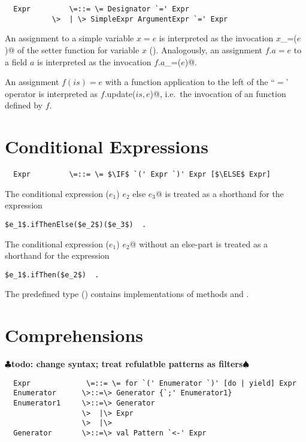 \documentclass[11pt]{report}
\renewcommand{\todo}[1]{{$\clubsuit$\bf todo: #1$\spadesuit$}}
\begin{document}
\syntax\begin{verbatim}
  Expr	       \=::= \= Designator `=' Expr
	       \>  | \> SimpleExpr ArgumentExpr `=' Expr
\end{verbatim}

An assignment to a simple variable $x = e$ is interpreted as the invocation
\verb@$x$_=($e$)@ of the setter function for variable
$x$ ().
Analogously, an assignment $f.a = e$ to a field $a$ is interpreted
as the invocation \verb@$f.a$_=($e$)@.

An assignment $f(is) = e$ with a function application to the
left of the ``$=$' operator is interpreted as \verb@$f$.update($is, e$)@, i.e.\
the invocation of an \verb@update@ function defined by $f$.

\section{Conditional Expressions}

\syntax\begin{verbatim}
  Expr	       \=::= \= $\IF$ `(' Expr `)' Expr [$\ELSE$ Expr]
\end{verbatim}

The conditional expression \verb@if ($e_1$) $e_2$ else $e_3$@ is treated as
a shorthand for the expression
\begin{verbatim}
$e_1$.ifThenElse($e_2$)($e_3$)  .
\end{verbatim}
The conditional expression \verb@if ($e_1$) $e_2$@ without an
else-part is treated as a shorthand for the expression
\begin{verbatim}
$e_1$.ifThen($e_2$)  .
\end{verbatim}
The predefined type \verb@Boolean@ ()
contains implementations of
methods \verb@ifThen@ and \verb@ifThenElse@.

\section{Comprehensions}

\todo{change syntax; treat refulatble patterns as filters}

\syntax\begin{verbatim}
  Expr	           \=::= \= for `(' Enumerator `)' [do | yield] Expr
  Enumerator      \>::=\> Generator {`;' Enumerator1}
  Enumerator1     \>::=\> Generator
                  \>  |\> Expr
                  \>  |\>
  Generator       \>::=\> val Pattern `<-' Expr
\end{verbatim}
\end{document}

